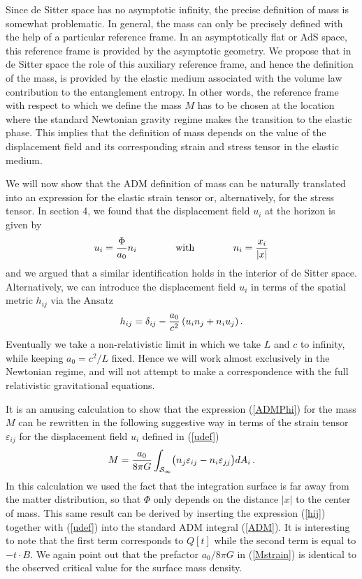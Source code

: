 \documentclass[a4paper,12pt]{article}
\newcommand{\be}{\begin{equation}}
\newcommand{\ee}{\end{equation}}
\begin{document}
Since de Sitter space has no asymptotic infinity, the precise definition of mass is somewhat problematic. In general, the mass can only be precisely defined with the help of a particular reference frame. In an asymptotically flat or AdS space, this reference frame is provided by the asymptotic geometry. We propose that in de Sitter space the role of this auxiliary reference frame, and hence the definition of the mass, is provided by the elastic medium associated with the volume law contribution to the entanglement entropy.   In other words, the reference frame with respect to which we define the mass $M$ has to be chosen at the location where the standard Newtonian gravity regime makes the transition to the elastic phase. This implies that the definition of mass depends on the value of the displacement field and its corresponding strain and stress tensor in the elastic medium. 

We will now show that the ADM definition of mass can be naturally translated into an expression for the elastic strain tensor or, alternatively, for the stress tensor.  In section 4, we  
found that the displacement field $u_i$ at the horizon is given by
\be
\label{udef}
u_i = {\Phi\over a_0} n_i \qquad\qquad\mbox{with}\qquad\qquad n_i ={x_i\over |x|}
\ee 
and we argued that a similar identification holds in the interior of de Sitter space.  Alternatively, we can introduce the displacement field $u_i$ in terms of the spatial metric $h_{ij}$ via the Ansatz
\be
\label{hij}
h_{ij} =\delta_{ij} - {a_0\over c^2} \left(u_i n_j +n_i u_j\right) .
\ee
Eventually we take a non-relativistic limit in which we take $L$ and $c$ to infinity, while keeping 
$a_0 = c^2/L$ fixed.  Hence we will work almost exclusively in the Newtonian regime, and will not attempt to make a correspondence with the full relativistic gravitational equations. 


It is an amusing calculation to show that the expression (\ref{ADMPhi}) for the mass $M$ can be rewritten in the following suggestive way in terms of the strain tensor $\varepsilon_{ij}$ for the displacement field $u_i$ defined in (\ref{udef})
\be
\label{Mstrain}
M =  {a_0\over 8\pi G} \int_{{\cal S}_\infty} \bigl( n_j\varepsilon_{ij}-n_i \varepsilon_{jj} \bigr) dA_i \,.
\ee
In this calculation we used the fact that the integration surface is far away from the matter distribution,  so that $\Phi$ only depends on the distance $|x|$ to the center of mass.  This same result can be derived by inserting the expression (\ref{hij}) together with (\ref{udef}) into the standard ADM integral (\ref{ADM}). It is interesting to note that the first term corresponds to $Q[t]$ while the second term is equal to $-t \cdot B$.   We again point out that the prefactor $a_0/8\pi G$ in (\ref{Mstrain}) is identical to the observed critical value for the surface mass density. 
\end{document}
